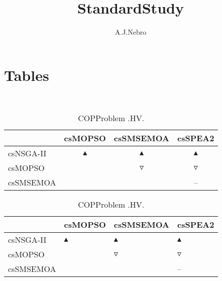 \documentclass{article}
\title{StandardStudy}
\author{A.J.Nebro}
\begin{document}
\maketitle
\section{Tables}
\
\begin{table}
\caption{
COPProblem
.HV.}
\label{Table:
COPProblem
.HV.}
\centering
\begin{scriptsize}
\begin{tabular}{
lccc
}
\hline  & csMOPSO & csSMSEMOA & csSPEA2\\ 
\hline 
csNSGA-II
 & 
$\blacktriangle$
 & 
$\blacktriangle$
 & 
$\blacktriangle$
 \\ 
csMOPSO
 & 
  
 & 
$\triangledown$
 & 
$\triangledown$
 \\ 
csSMSEMOA
 & 
 
 & 
  
 & 
--
 \\ 
\hline
\end{tabular}
\end{scriptsize}
\end{table}
\begin{table}
\caption{
COPProblem 
.HV.}
\label{Table:
COPProblem 
.HV.}
\centering
\begin{scriptsize}
\begin{tabular}{
| l | p{0.15cm}   | p{0.15cm}   | p{0.15cm}   | 
}
\hline \multicolumn{1}{|c|}{} & \multicolumn{1}{c|}{csMOPSO} & \multicolumn{1}{c|}{csSMSEMOA} & \multicolumn{1}{c|}{csSPEA2} \\
\hline 
csNSGA-II
 & 
$\blacktriangle$
 & 
$\blacktriangle$
 & 
$\blacktriangle$
 \\ 
csMOPSO
 & 
  
 & 
$\triangledown$
 & 
$\triangledown$
 \\ 
csSMSEMOA
 & 
 
 & 
  
 & 
--
 \\ 
\hline
\end{tabular}
\end{scriptsize}
\end{table}
\end{document}
